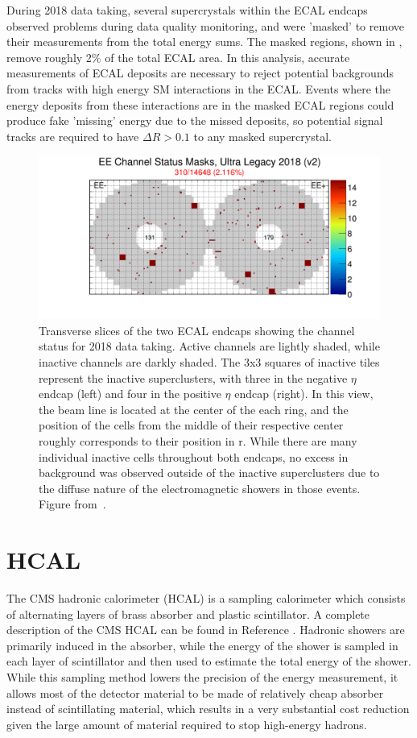 During 2018 data taking, several supercrystals within the ECAL endcaps observed problems during data quality monitoring, and were 'masked' to remove their measurements from the total energy sums.
The masked regions, shown in , remove roughly 2$\%$ of the total ECAL area.
In this analysis, accurate measurements of ECAL deposits are necessary to reject potential backgrounds from tracks with high energy SM interactions in the ECAL.
Events where the energy deposits from these interactions are in the masked ECAL regions could produce fake 'missing' energy due to the missed deposits, so potential signal tracks are required to have $\Delta R>0.1$ to any masked supercrystal.

\begin{figure}[htbp]
    \includegraphics[width=\textwidth]{figures/EEChannelMasks.png}
    \centering
	\caption[Masked ECAL cells]{Transverse slices of the two ECAL endcaps showing the channel status for 2018 data taking. Active channels are lightly shaded, while inactive channels are darkly shaded. The 3x3 squares of inactive tiles represent the inactive superclusters, with three in the negative $\eta$ endcap (left) and four in the positive $\eta$ endcap (right). In this view, the beam line is located at the center of the each ring, and the position of the cells from the middle of their respective center roughly corresponds to their position in r. While there are many individual inactive cells throughout both endcaps, no excess in background was observed outside of the inactive superclusters due to the diffuse nature of the electromagnetic showers in those events. Figure from~\cite{EcalDPG}.}
    \label{fig:EEmasks}
\end{figure}

\section{HCAL}
The CMS hadronic calorimeter (HCAL) is a sampling calorimeter which consists of alternating layers of brass absorber and plastic scintillator. 
A complete description of the CMS HCAL can be found in Reference \cite{HCALtdr}.
Hadronic showers are primarily induced in the absorber, while the energy of the shower is sampled in each layer of scintillator and then used to estimate the total energy of the shower. 
While this sampling method lowers the precision of the energy measurement, it allows most of the detector material to be made of relatively cheap absorber instead of scintillating material, which results in a very substantial cost reduction given the large amount of material required to stop high-energy hadrons.

